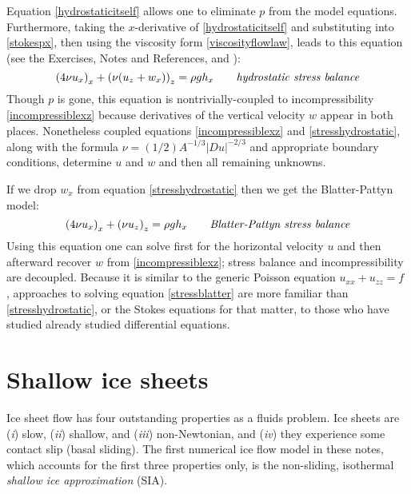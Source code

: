 \documentclass[letterpaper,final,12pt,reqno]{amsart}
\begin{document}
Equation \eqref{hydrostaticitself} allows one to eliminate $p$ from the model equations.  Furthermore, taking the $x$-derivative of \eqref{hydrostaticitself} and substituting into \eqref{stokespx}, then using the viscosity form \eqref{viscosityflowlaw}, leads to this equation (see the Exercises, Notes and References, and \cite{GreveBlatter2009}):
\begin{equation}
\left(4 \nu u_x\right)_x + \left(\nu (u_z+w_x)\right)_z = \rho g h_x \qquad\text{\emph{hydrostatic stress balance}} \label{stresshydrostatic}
\end{equation}
Though $p$ is gone, this equation is nontrivially-coupled to incompressibility \eqref{incompressiblexz} because derivatives of the vertical velocity $w$ appear in both places.  Nonetheless coupled equations \eqref{incompressiblexz} and \eqref{stresshydrostatic}, along with the formula $\nu = (1/2) A^{-1/3} |Du|^{-2/3}$ and appropriate boundary conditions, determine $u$ and $w$ and then all remaining unknowns.

If we drop $w_x$ from equation \eqref{stresshydrostatic} then we get the Blatter-Pattyn model:
\begin{equation}
\left(4 \nu u_x\right)_x + \left(\nu u_z\right)_z = \rho g h_x \qquad\text{\emph{Blatter-Pattyn stress balance}} \label{stressblatter}
\end{equation}
Using this equation one can solve first for the horizontal velocity $u$ and then afterward recover $w$ from \eqref{incompressiblexz}; stress balance and incompressibility are decoupled.  Because it is similar to the generic Poisson equation $u_{xx} + u_{zz} = f$ \cite{MortonMayers}, approaches to solving equation \eqref{stressblatter} are more familiar than \eqref{stresshydrostatic}, or the Stokes equations for that matter, to those who have studied already studied differential equations.


\section{Shallow ice sheets}   \label{sec:sia}

Ice sheet flow has four outstanding properties as a fluids problem.  Ice sheets are (\emph{i}) slow, (\emph{ii}) shallow,  and (\emph{iii}) non-Newtonian, and (\emph{iv}) they experience some contact slip (basal sliding).  The first numerical ice flow model in these notes, which accounts for the first three properties only, is the non-sliding, isothermal \emph{shallow ice approximation} (SIA).
\end{document}
